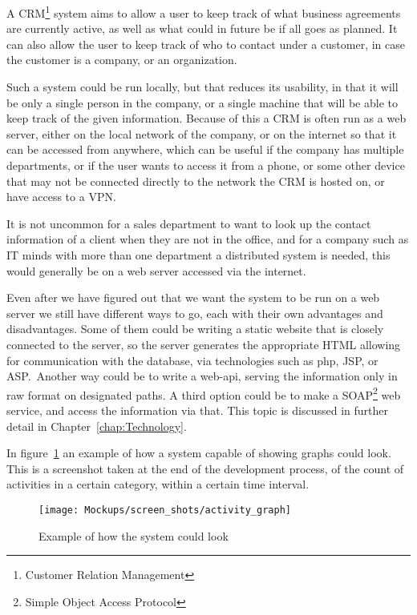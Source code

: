 A CRM\footnote{Customer Relation Management} system aims to allow a user to keep
track of what business agreements are currently active, as well as what could in
future be if all goes as planned. It can also allow the user to keep track of
who to contact under a customer, in case the customer is a company, or an
organization. 

Such a system could be run locally, but that reduces its usability, in that it
will be only a single person in the company, or a single machine that will be
able to keep track of the given information. Because of this a CRM is often run
as a web server, either on the local network of the company, or on the internet
so that it can be accessed from anywhere, which can be useful if the company has
multiple departments, or if the user wants to access it from a phone, or some
other device that may not be connected directly to the network the CRM is hosted
on, or have access to a VPN.\

It is not uncommon for a sales department to want to look up the contact
information of a client when they are not in the office, and for a company such
as IT minds with more than one department a distributed system is needed, this 
would generally be on a web server accessed via the internet. 

Even after we have figured out that we want the system to be run on a web server
we still have different ways to go, each with their own advantages and
disadvantages. Some of them could be writing a static website that is closely
connected to the server, so the server generates the appropriate HTML allowing
for communication with the database, via technologies such as php, JSP, or ASP.\
Another way could be to write a web-api, serving the information only in raw
format on designated paths. A third option could be to make a
SOAP\footnote{Simple Object Access Protocol} web service, and access the
information via that. This topic is discussed in further detail in
Chapter~\ref{chap:Technology}. 

In figure~\ref{fig:sys_example} an example of how a system capable of showing
graphs could look. This is a screenshot taken at the end of the development
process, of the count of activities in a certain category, within a certain time interval.

\begin{figure}[h]
\centering
\texttt{[image: Mockups/screen\_shots/activity\_graph]}
\caption{Example of how the system could look}
\label{fig:sys_example}
\end{figure}

